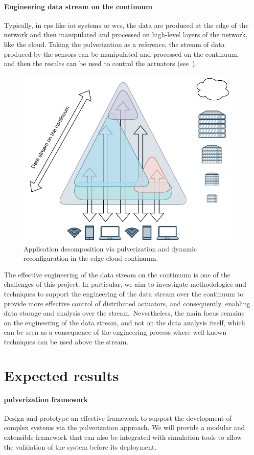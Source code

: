 \documentclass[12pt,a4paper]{article}
\newcommand{\meta}[1]{{\color{blue}#1}}
\begin{document}
\paragraph{Engineering data stream on the continuum}\label{sec:eng-data-stream}
\meta{
Typically,
in \ac{cps} like \ac{iot} systems or \ac{wcs},
the data are produced at the edge of the network and then manipulated and processed on high-level layers of the network, like the cloud.
%
Taking the pulverization as a reference,
the stream of data produced by the sensors can be manipulated and processed on the continuum,
and then the results can be used to control the actuators (see~\Cref{fig:data-stream}).
%
\begin{figure}[ht]
	\centering
	\includegraphics[width=.55\textwidth]{img/data-stream.drawio.pdf}
	\caption{Application decomposition via pulverization and dynamic reconfiguration in the edge-cloud continuum.}
	\label{fig:data-stream}
\end{figure}
%
The effective engineering of the data stream on the continuum is one of the challenges of this project.
%
In particular,
we aim to investigate methodologies and techniques to support the engineering of the data stream over the continuum to provide more effective control of distributed actuators,
and consequently,
enabling data storage and analysis over the stream.
%
Nevertheless,
the main focus remains on the engineering of the data stream,
and not on the data analysis itself,
which can be seen as a consequence of the engineering process where well-known techniques can be used above the stream.
}

\section{Expected results}\label{sec:expected-results}

\paragraph{pulverization framework}
Design and prototype an effective framework to support the development of complex systems
via the pulverization approach.
%
We will provide a modular and extensible framework that can also be integrated with simulation tools
to allow the validation of the system before its deployment.
\end{document}
